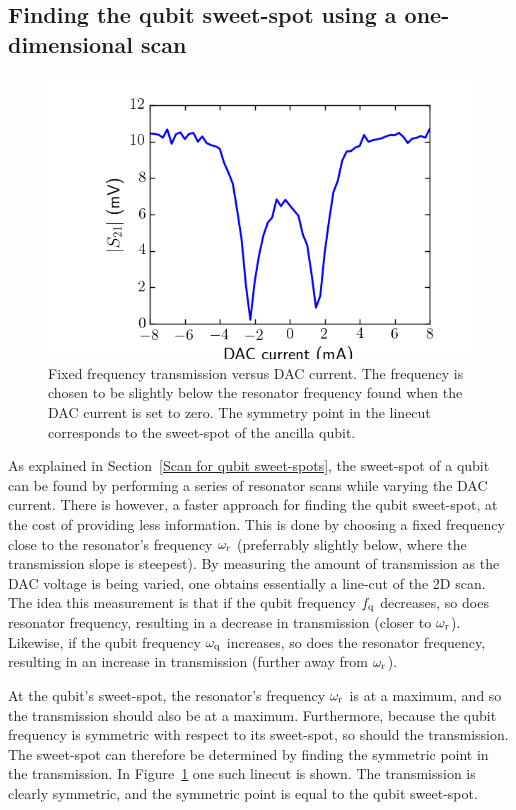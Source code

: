       \subsection{Finding the qubit sweet-spot using a one-dimensional scan}
        \label{Finding the qubit sweet-spot using a one-dimensional scan}
        \begin{figure}[tb]
          \centering
          \includegraphics[width=.6\linewidth]{../Figures/Qubit characterization/Resonator vs DAC linecut.png}
          \caption{Fixed frequency transmission versus DAC current. The frequency is chosen to be slightly below the resonator frequency found when the DAC current is set to zero. The symmetry point in the linecut corresponds to the sweet-spot of the ancilla qubit.}
          \label{fig:resonator vs dac linecut}
        \end{figure}

        As explained in Section~\ref{Scan for qubit sweet-spots}, the sweet-spot of a qubit can be found by performing a series of resonator scans while varying the DAC current. There is however, a faster approach for finding the qubit sweet-spot, at the cost of providing less information. This is done by choosing a fixed frequency close to the resonator's frequency $\omega_\text{r}$ (preferrably slightly below, where the transmission slope is steepest). By measuring the amount of transmission as the DAC voltage is being varied, one obtains essentially a line-cut of the 2D scan. The idea this measurement is that if the qubit frequency $f_\text{q}$ decreases, so does resonator frequency, resulting in a decrease in transmission (closer to $\omega_\text{r}$). Likewise, if the qubit frequency $\omega_\text{q}$ increases, so does the resonator frequency, resulting in an increase in transmission (further away from $\omega_\text{r}$).

        At the qubit's sweet-spot, the resonator's frequency $\omega_\text{r}$ is at a maximum, and so the transmission should also be at a maximum. Furthermore, because the qubit frequency is symmetric with respect to its sweet-spot, so should the transmission. The sweet-spot can therefore be determined by finding the symmetric point in the transmission. In Figure~\ref{fig:resonator vs dac linecut} one such linecut is shown. The transmission is clearly symmetric, and the symmetric point is equal to the qubit sweet-spot.

